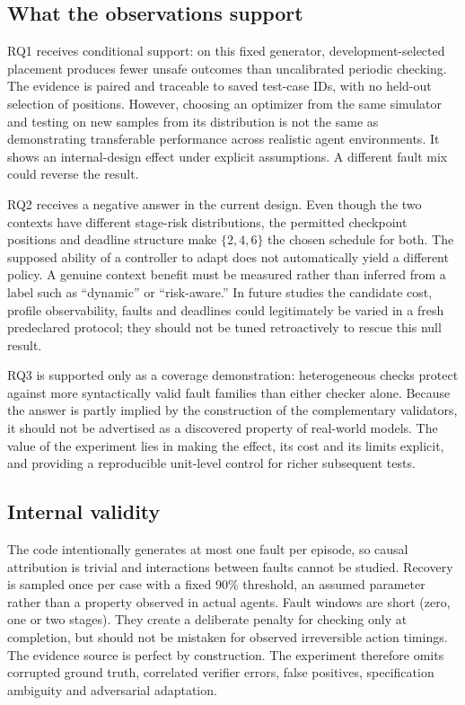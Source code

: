 \documentclass[conference]{IEEEtran}
\begin{document}
\subsection{What the observations support}
RQ1 receives conditional support: on this fixed generator, development-selected placement produces fewer unsafe outcomes than uncalibrated periodic checking. The evidence is paired and traceable to saved test-case IDs, with no held-out selection of positions. However, choosing an optimizer from the same simulator and testing on new samples from its distribution is not the same as demonstrating transferable performance across realistic agent environments. It shows an internal-design effect under explicit assumptions. A different fault mix could reverse the result.

RQ2 receives a negative answer in the current design. Even though the two contexts have different stage-risk distributions, the permitted checkpoint positions and deadline structure make $\{2,4,6\}$ the chosen schedule for both. The supposed ability of a controller to adapt does not automatically yield a different policy. A genuine context benefit must be measured rather than inferred from a label such as ``dynamic'' or ``risk-aware.'' In future studies the candidate cost, profile observability, faults and deadlines could legitimately be varied in a fresh predeclared protocol; they should not be tuned retroactively to rescue this null result.

RQ3 is supported only as a coverage demonstration: heterogeneous checks protect against more syntactically valid fault families than either checker alone. Because the answer is partly implied by the construction of the complementary validators, it should not be advertised as a discovered property of real-world models. The value of the experiment lies in making the effect, its cost and its limits explicit, and providing a reproducible unit-level control for richer subsequent tests.

\subsection{Internal validity}
The code intentionally generates at most one fault per episode, so causal attribution is trivial and interactions between faults cannot be studied. Recovery is sampled once per case with a fixed 90\% threshold, an assumed parameter rather than a property observed in actual agents. Fault windows are short (zero, one or two stages). They create a deliberate penalty for checking only at completion, but should not be mistaken for observed irreversible action timings. The evidence source is perfect by construction. The experiment therefore omits corrupted ground truth, correlated verifier errors, false positives, specification ambiguity and adversarial adaptation.
\end{document}
